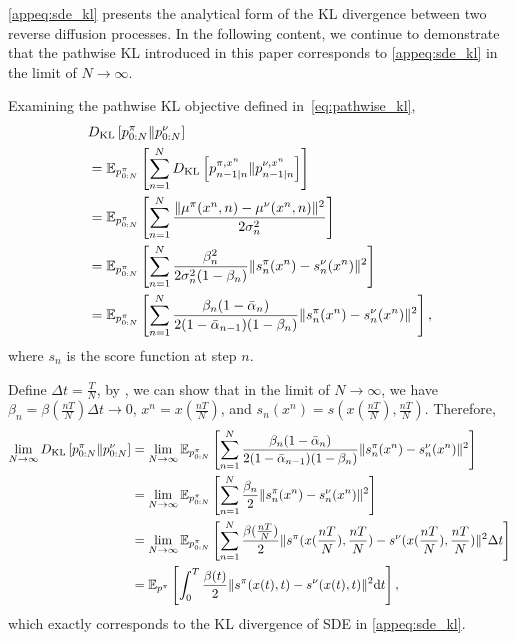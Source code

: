 \eqref{appeq:sde_kl} presents the analytical form of the KL divergence between two reverse diffusion processes. In the following content, we continue to demonstrate that the pathwise KL introduced in this paper corresponds to \eqref{appeq:sde_kl} in the limit of $N\to\infty$. 

Examining the pathwise KL objective defined in~\eqref{eq:pathwise_kl}, 
\begin{equation}
    \begin{aligned}
        &D_{\rm KL}\left[p^{\pi}_{0:N}\|p^{\nu}_{0:N}\right]\\
        &=\mathbb{E}_{p^{\pi}_{0:N}}\left[\sum_{n=1}^{N}D_{\rm KL}\left[p^{\pi,x^n}_{n-1|n}\|p^{\nu,x^n}_{n-1|n}\right]\right]\\
        &=\mathbb{E}_{p^{\pi}_{0:N}}\left[\sum_{n=1}^N \frac{\|\mu^\pi(x^n, n)-\mu^\nu(x^n, n)\|^2}{2\sigma_n^2}\right]\\
        &=\mathbb{E}_{p^{\pi}_{0:N}}\left[\sum_{n=1}^N \frac{\beta_n^2}{2\sigma_n^2(1-\beta_n)}\|s_n^\pi(x^n)-s_n^\nu(x^n)\|^2\right]\\
        &=\mathbb{E}_{p^{\pi}_{0:N}}\left[\sum_{n=1}^N \frac{\beta_n(1-\bar{\alpha}_n)}{2(1-\bar{\alpha}_{n-1})(1-\beta_n)}\|s_n^\pi(x^n)-s_n^\nu(x^n)\|^2\right],
    \end{aligned}
\end{equation}
where $s_n$ is the score function at step $n$. 

Define $\Delta t=\frac TN$, by \citet{diffusion_sde}, we can show that in the limit of $N\to\infty$, we have $\beta_n=\beta(\frac {nT}N)\Delta t\to0$, $x^n=x(\frac {nT}N)$, and $s_n(x^n)=s(x(\frac {nT}N), \frac {nT}N)$. Therefore, 
\begin{equation}
    \begin{aligned}
        \lim_{N\to\infty}D_{\rm KL}\left[p^{\pi}_{0:N}\|p^{\nu}_{0:N}\right]&=\lim _{N\to\infty}\mathbb{E}_{p^{\pi}_{0:N}}\left[\sum_{n=1}^N \frac{\beta_n(1-\bar{\alpha}_n)}{2(1-\bar{\alpha}_{n-1})(1-\beta_n)}\|s_n^\pi(x^n)-s_n^\nu(x^n)\|^2\right]\\
        &=\lim _{N\to\infty}\mathbb{E}_{p^{\pi}_{0:N}}\left[\sum_{n=1}^N \frac{\beta_n}{2}\|s_n^\pi(x^n)-s_n^\nu(x^n)\|^2\right]\\
        &=\lim _{N\to\infty}\mathbb{E}_{p^{\pi}_{0:N}}\left[\sum_{n=1}^N \frac{\beta(\frac {nT}N)}{2}\|s^\pi(x(\frac {nT}N), \frac {nT}N)-s^\nu(x(\frac {nT}N), \frac {nT}N)\|^2\Delta t\right]\\
        &=\mathbb{E}_{p^\pi}\left[\int_0^T\frac{\beta(t)}{2}\|s^\pi(x(t), t)-s^\nu(x(t), t)\|^2\mathrm{d}t\right],
    \end{aligned}
\end{equation}
which exactly corresponds to the KL divergence of SDE in \eqref{appeq:sde_kl}. 

